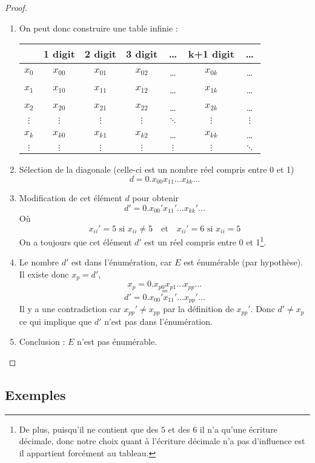 \begin{mytheo}
\begin{proof}
		\begin{enumerate}
			\item On peut donc construire une table infinie : \\
				\begin{tabular}{|c||c|c|c|c|c|c|}
					\hline
					& 1 digit & 2 digit & 3 digit & \dots & k+1 digit & \dots \\
					\hline
					$x_0$ & $x_{00}$ & $x_{01}$ & $x_{02}$ & \dots & $x_{0k}$ & \dots \\
					$x_1$ & $x_{10}$ & $x_{11}$ & $x_{12}$ & \dots & $x_{1k}$ & \dots \\
					$x_2$ & $x_{20}$ & $x_{21}$ & $x_{22}$ & \dots & $x_{2k}$ & \dots \\
					$\vdots$& $\vdots$& $\vdots$& $\vdots$& $\ddots$& $\vdots$& $\vdots$\\
					$x_k$ & $x_{k0}$ & $x_{k1}$ & $x_{k2}$ & \dots & $x_{kk}$ & \dots \\
					$\vdots$& $\vdots$& $\vdots$& $\vdots$& $\vdots$& $\vdots$& $\ddots$\\
					\hline
				\end{tabular}
			\item Sélection de la diagonale (celle-ci est un nombre réel compris
				entre 0 et 1)
				\[ d=0.x_{00}x_{11}\dots x_{kk}\dots \]
			\item Modification de cet élément $d$ pour obtenir
				\[ d'=0.x_{00}'x_{11}'\dots x_{kk}'\dots \]
				Où
                $$x_{ii}'=5\text{ si }x_{ii}\neq 5\quad\text{et}\quad x_{ii}'=6\text{ si }x_{ii}= 5$$
				On a toujours que cet élément $d'$ est un réel compris entre 0 et 1\footnote{De plus, puisqu'il ne contient que des $5$ et des $6$ il n'a qu'une écriture décimale, donc notre choix quant à l'écriture décimale n'a pas d'influence est il appartient forcément au tableau.}.
			\item Le nombre $d'$ est dans l'énumération, car $E$ est
				énumérable (par hypothèse). Il existe donc $x_p=d'$,
				\[ x_p=0.x_{p0}x_{p1}\dots x_{pp}\dots \]
				\[=\]
				\[ d'=0.x_{00}'x_{11}'\dots x_{pp}'\dots \]
				Il y a une contradiction car $x_{pp}' \neq
			       	x_{pp}$ par la définition de $x_{pp}'$. Donc $d' \neq x_p$ ce qui implique que $d'$ n'est pas
				dans l'énumération.
			\item Conclusion : $E$ n'est pas énumérable.
		\end{enumerate}
	\end{proof}
\end{mytheo}

\subsection{Exemples}
\label{subsec:exemples_non_enum}

